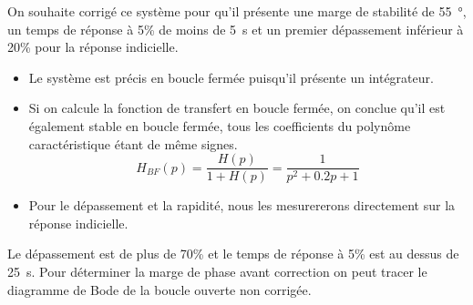 On souhaite corrigé ce système pour qu'il présente une marge de stabilité de
\SI{55}{\degree}, un temps de réponse à 5\% de moins de \SI{5}{\second} et 
un premier dépassement inférieur à 20\% pour la réponse indicielle.
\begin{itemize}
    \item Le système est précis en boucle fermée puisqu'il présente 
          un intégrateur.
    \item Si on calcule la fonction de transfert en boucle fermée, on conclue 
          qu'il est également stable en boucle fermée, tous les coefficients
          du polynôme caractéristique étant de même signes.
          \[
            H_{BF}(p)=\dfrac{H(p)}{1+H(p)}=\dfrac{1}{p^2+0.2p+1}
          \]
    \item Pour le dépassement et la rapidité, nous les mesurererons 
          directement sur la réponse indicielle.
\end{itemize}
\begin{center}
    
\end{center}
Le dépassement est de plus de 70\% et le temps de réponse à 5\% est au dessus 
de \SI{25}{\second}.
Pour déterminer la marge de phase avant correction on peut tracer le diagramme
de Bode de la boucle ouverte non corrigée.
\begin{center}
    
\end{center}
